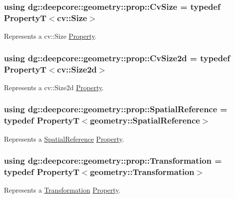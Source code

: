 \subsubsection[{\texorpdfstring{Cv\+Size}{CvSize}}]{\setlength{\rightskip}{0pt plus 5cm}using {\bf dg\+::deepcore\+::geometry\+::prop\+::\+Cv\+Size} = typedef PropertyT$<$cv\+::\+Size$>$}\hypertarget{group___geometry_properties_ga6c3ae9a94a21cad03ae025518ed4376c}{}\label{group___geometry_properties_ga6c3ae9a94a21cad03ae025518ed4376c}


Represents a {\ttfamily cv\+::\+Size} \hyperlink{classdg_1_1deepcore_1_1_property}{Property}. 

\subsubsection[{\texorpdfstring{Cv\+Size2d}{CvSize2d}}]{\setlength{\rightskip}{0pt plus 5cm}using {\bf dg\+::deepcore\+::geometry\+::prop\+::\+Cv\+Size2d} = typedef PropertyT$<$cv\+::\+Size2d$>$}\hypertarget{group___geometry_properties_gab05ab73bf2f4d38593c25af9928dd476}{}\label{group___geometry_properties_gab05ab73bf2f4d38593c25af9928dd476}


Represents a {\ttfamily cv\+::\+Size2d} \hyperlink{classdg_1_1deepcore_1_1_property}{Property}. 

\subsubsection[{\texorpdfstring{Spatial\+Reference}{SpatialReference}}]{\setlength{\rightskip}{0pt plus 5cm}using {\bf dg\+::deepcore\+::geometry\+::prop\+::\+Spatial\+Reference} = typedef PropertyT$<$geometry\+::\+Spatial\+Reference$>$}\hypertarget{group___geometry_properties_gae23c0f56a7a0e1cf724aaddb7aa3727f}{}\label{group___geometry_properties_gae23c0f56a7a0e1cf724aaddb7aa3727f}


Represents a \hyperlink{classdg_1_1deepcore_1_1geometry_1_1_spatial_reference}{Spatial\+Reference} \hyperlink{classdg_1_1deepcore_1_1_property}{Property}. 

\subsubsection[{\texorpdfstring{Transformation}{Transformation}}]{\setlength{\rightskip}{0pt plus 5cm}using {\bf dg\+::deepcore\+::geometry\+::prop\+::\+Transformation} = typedef PropertyT$<$geometry\+::\+Transformation$>$}\hypertarget{group___geometry_properties_gaee5fb371295b38850e2e6eabd04be3b3}{}\label{group___geometry_properties_gaee5fb371295b38850e2e6eabd04be3b3}


Represents a \hyperlink{structdg_1_1deepcore_1_1geometry_1_1_transformation}{Transformation} \hyperlink{classdg_1_1deepcore_1_1_property}{Property}. 

